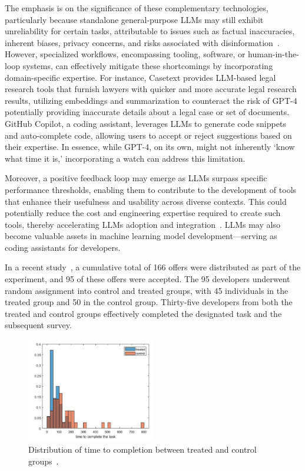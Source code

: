 \documentclass[a4paper,oneside]{book}
\begin{document}
The emphasis is on the significance of these complementary technologies, particularly because standalone general-purpose LLMs may still exhibit unreliability for certain tasks, attributable to issues such as factual inaccuracies, inherent biases, privacy concerns, and risks associated with disinformation~\cite{abid2021persistent, schramowski2022large, goldstein2023generative}. However, specialized workflows, encompassing tooling, software, or human-in-the-loop systems, can effectively mitigate these shortcomings by incorporating domain-specific expertise. For instance, Casetext provides LLM-based legal research tools that furnish lawyers with quicker and more accurate legal research results, utilizing embeddings and summarization to counteract the risk of GPT-4 potentially providing inaccurate details about a legal case or set of documents. GitHub Copilot, a coding assistant, leverages LLMs to generate code snippets and auto-complete code, allowing users to accept or reject suggestions based on their expertise. In essence, while GPT-4, on its own, might not inherently `know what time it is,' incorporating a watch can address this limitation.

Moreover, a positive feedback loop may emerge as LLMs surpass specific performance thresholds, enabling them to contribute to the development of tools that enhance their usefulness and usability across diverse contexts. This could potentially reduce the cost and engineering expertise required to create such tools, thereby accelerating LLMs adoption and integration~\cite{chen2021evaluating, peng2023impact}. LLMs may also become valuable assets in machine learning model development—serving as coding assistants for developers.

In a recent study~\cite{peng2023impact}, a cumulative total of 166 offers were distributed as part of the experiment, and 95 of these offers were accepted. The 95 developers underwent random assignment into control and treated groups, with 45 individuals in the treated group and 50 in the control group. Thirty-five developers from both the treated and control groups effectively completed the designated task and the subsequent survey.

\begin{figure}[H]
    \centering
    \includegraphics[width=0.5\textwidth]{img/task_completion_time.png}
    \caption{Distribution of time to completion between treated and control groups~\cite{peng2023impact}.}\label{fig:task_completion_time}
\end{figure}
\end{document}
